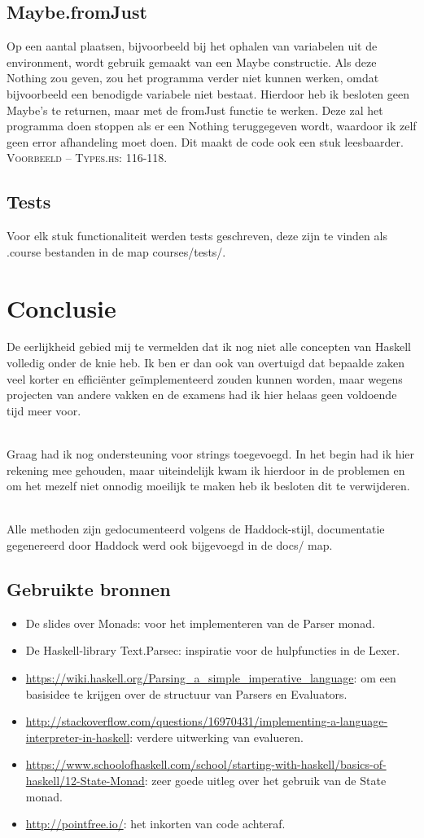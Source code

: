 \documentclass[12pt,a4paper]{report}
\begin{document}
\section{Maybe.fromJust}
Op een aantal plaatsen, bijvoorbeeld bij het ophalen van variabelen uit de environment, wordt gebruik gemaakt van een Maybe constructie. Als deze Nothing zou geven, zou het programma verder niet kunnen werken, omdat bijvoorbeeld een benodigde variabele niet bestaat. Hierdoor heb ik besloten geen Maybe’s te returnen, maar met de fromJust functie te werken. Deze zal het programma doen stoppen als er een Nothing teruggegeven wordt, waardoor ik zelf geen error afhandeling moet doen. Dit maakt de code ook een stuk leesbaarder. \textsc{Voorbeeld – Types.hs: 116-118.}
\section{Tests}
Voor elk stuk functionaliteit werden tests geschreven, deze zijn te vinden als .course bestanden in de map courses/tests/.
\chapter{Conclusie}
De eerlijkheid gebied mij te vermelden dat ik nog niet alle concepten van Haskell volledig onder de knie heb. Ik ben er dan ook van overtuigd dat bepaalde zaken veel korter en efficiënter geïmplementeerd zouden kunnen worden, maar wegens projecten van andere vakken en de examens had ik hier helaas geen voldoende tijd meer voor.\par\mbox{}\\
Graag had ik nog ondersteuning voor strings toegevoegd. In het begin had ik hier rekening mee gehouden, maar uiteindelijk kwam ik hierdoor in de problemen en om het mezelf niet onnodig moeilijk te maken heb ik besloten dit te verwijderen.\par\mbox{}\\
Alle methoden zijn gedocumenteerd volgens de Haddock-stijl, documentatie gegenereerd door Haddock werd ook bijgevoegd in de docs/ map.
\section{Gebruikte bronnen}
\begin{itemize}
  \item De slides over Monads: voor het implementeren van de Parser monad.
  \item De Haskell-library Text.Parsec: inspiratie voor de hulpfuncties in de Lexer.
  \item \url{https://wiki.haskell.org/Parsing_a_simple_imperative_language}: om een basisidee te krijgen over de structuur van Parsers en Evaluators.
  \item \url{http://stackoverflow.com/questions/16970431/implementing-a-language-interpreter-in-haskell}: verdere uitwerking van evalueren.
  \item \url{https://www.schoolofhaskell.com/school/starting-with-haskell/basics-of-haskell/12-State-Monad}: zeer goede uitleg over het gebruik van de State monad.
  \item \url{http://pointfree.io/}: het inkorten van code achteraf.
\end{itemize}
\newpage
\end{document}
